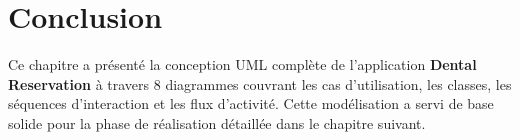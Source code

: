 \section{Conclusion}

Ce chapitre a présenté la conception UML complète de l'application \textbf{Dental Reservation} à travers 8 diagrammes couvrant les cas d'utilisation, les classes, les séquences d'interaction et les flux d'activité. Cette modélisation a servi de base solide pour la phase de réalisation détaillée dans le chapitre suivant.
